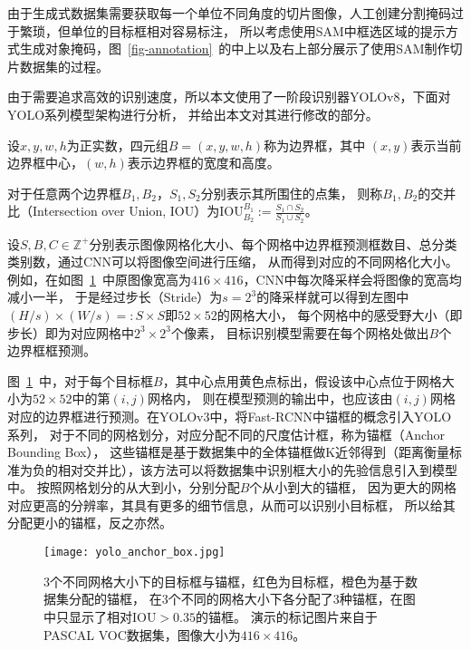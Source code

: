 由于生成式数据集需要获取每一个单位不同角度的切片图像，人工创建分割掩码过于繁琐，但单位的目标框相对容易标注，
所以考虑使用SAM中框选区域的提示方式生成对象掩码，图~\ref{fig-annotation}~的中上以及右上部分展示了使用SAM制作切片数据集的过程。

由于需要追求高效的识别速度，所以本文使用了一阶段识别器YOLOv8，下面对YOLO系列模型架构进行分析，
并给出本文对其进行修改的部分。

设$x,y,w,h$为正实数，四元组$B=(x,y,w,h)$称为边界框，其中
$(x,y)$表示当前边界框中心，$(w,h)$表示边界框的宽度和高度。

对于任意两个边界框$B_1,B_2$，$S_1,S_2$分别表示其所围住的点集，
则称$B_1,B_2$的交并比（Intersection over Union, IOU）为$\text{IOU}_{B_2}^{B_1}:=\frac{S_1\cap S_2}{S_1\cup S_2}$。

设$S,B,C\in\mathbb{Z}^+$分别表示图像网格化大小、每个网格中边界框预测框数目、总分类类别数，通过CNN可以将图像空间进行压缩，
从而得到对应的不同网格化大小。例如，在如图~\ref{fig-anchor}~中原图像宽高为$416\times 416$，CNN中每次降采样会将图像的宽高均减小一半，
于是经过步长（Stride）为$s=2^3$的降采样就可以得到左图中$(H/s)\times (W/s) =: S\times S$即$52\times 52$的网格大小，
每个网格中的感受野大小（即步长）即为对应网格中$2^3\times 2^3$个像素，
目标识别模型需要在每个网格处做出$B$个边界框框预测。

图~\ref{fig-anchor}~中，对于每个目标框$B$，其中心点用黄色点标出，假设该中心点位于网格大小为$52\times 52$中的第$(i,j)$网格内，
则在模型预测的输出中，也应该由$(i,j)$网格对应的边界框进行预测。在YOLOv3中，将Fast-RCNN中锚框的概念引入YOLO系列，
对于不同的网格划分，对应分配不同的尺度估计框，称为锚框（Anchor Bounding Box），
这些锚框是基于数据集中的全体锚框做K近邻得到（距离衡量标准为负的相对交并比），该方法可以将数据集中识别框大小的先验信息引入到模型中。
按照网格划分的从大到小，分别分配$B$个从小到大的锚框，
因为更大的网格对应更高的分辨率，其具有更多的细节信息，从而可以识别小目标框，
所以给其分配更小的锚框，反之亦然。

\begin{figure}[htbp]
  \centering
  \texttt{[image: yolo\_anchor\_box.jpg]}
  \caption{3个不同网格大小下的目标框与锚框，红色为目标框，橙色为基于数据集分配的锚框，
  在3个不同的网格大小下各分配了3种锚框，在图中只显示了相对$\text{IOU}>0.35$的锚框。
  演示的标记图片来自于PASCAL VOC数据集，图像大小为$416\times 416$。}
  \label{fig-anchor}
\end{figure}

